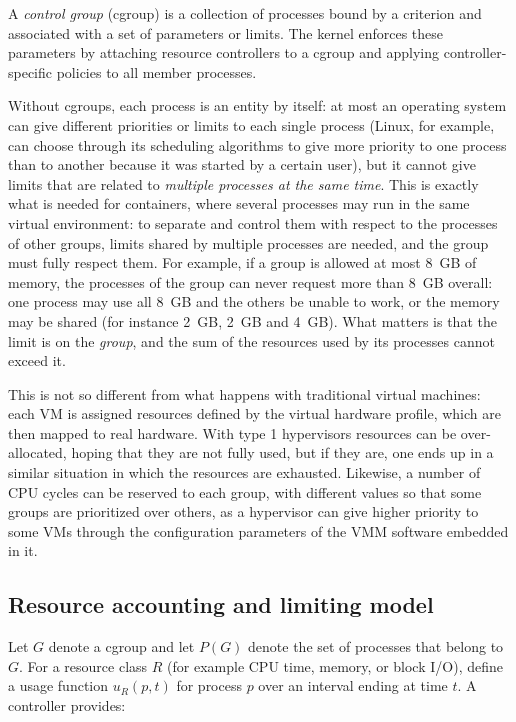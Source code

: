 A \emph{control group} (cgroup) is a collection of processes bound by a criterion and associated with a set of parameters or limits. The kernel enforces these parameters by attaching resource controllers to a cgroup and applying controller-specific policies to all member processes.

Without cgroups, each process is an entity by itself: at most an operating system can give different priorities or limits to each single process (Linux, for example, can choose through its scheduling algorithms to give more priority to one process than to another because it was started by a certain user), but it cannot give limits that are related to \emph{multiple processes at the same time}. This is exactly what is needed for containers, where several processes may run in the same virtual environment: to separate and control them with respect to the processes of other groups, limits shared by multiple processes are needed, and the group must fully respect them. For example, if a group is allowed at most 8~GB of memory, the processes of the group can never request more than 8~GB overall: one process may use all 8~GB and the others be unable to work, or the memory may be shared (for instance 2~GB, 2~GB and 4~GB). What matters is that the limit is on the \emph{group}, and the sum of the resources used by its processes cannot exceed it.

This is not so different from what happens with traditional virtual machines: each VM is assigned resources defined by the virtual hardware profile, which are then mapped to real hardware. With type 1 hypervisors resources can be over-allocated, hoping that they are not fully used, but if they are, one ends up in a similar situation in which the resources are exhausted. Likewise, a number of CPU cycles can be reserved to each group, with different values so that some groups are prioritized over others, as a hypervisor can give higher priority to some VMs through the configuration parameters of the VMM software embedded in it.

\subsection{Resource accounting and limiting model}

Let $G$ denote a cgroup and let $P(G)$ denote the set of processes that belong to $G$. For a resource class $R$ (for example CPU time, memory, or block I/O), define a usage function $u_R(p, t)$ for process $p$ over an interval ending at time $t$. A controller provides:

